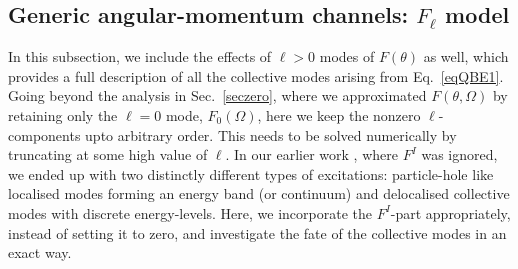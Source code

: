 \documentclass[aps, prb, onecolumn, nofootinbib, citeautoscript, 10pt]{revtex4-2}
\begin{document}
	

	
	
\subsection{Generic angular-momentum channels: $F_\ell$ model}
\label{seccode}


In this subsection, we include the effects of $\ell >0$ modes of $F(\theta)$ as well, which provides a full description of all the collective modes arising from Eq.~\eqref{eqQBE1}. Going beyond the analysis in Sec.~\ref{seczero}, where we approximated $F(\theta,\Omega)$ by retaining only the $\ell = 0$ mode, $F_0(\Omega)$, here we keep the nonzero $\ell$-components upto arbitrary order.  This needs to be solved numerically by truncating at some high value of $\ell$. In our earlier work \cite{ips-kazi}, where $F^I$ was ignored, we ended up with two distinctly different types of excitations: particle-hole like localised modes forming an energy band (or continuum) and delocalised collective modes with discrete energy-levels. Here, we incorporate the $F^I$-part appropriately, instead of setting it to zero, and investigate the fate of the collective modes in an exact way.
\end{document}
